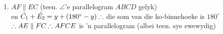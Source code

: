 \begin{eocsolutions}{}
{\begin{enumerate}[itemsep=5pt, label=\textbf{\arabic*}. ]
\begin{enumerate}[noitemsep, label=\textbf{(\alph*)} ]
In $\triangle ADE$\\
$\hat{D} + \hat{A_1} + \hat{E_1} = 180^{\circ}$ (som van $\angle$'e in $\triangle$)\\
$\therefore \hat{D} + y + y = 180^{\circ}\\
\therefore \hat{D} = 180^{\circ} - 2y$\\
$\hat{D} = 90^{\circ} - y\\
\therefore \hat{B} = 90^{\circ} - y$ (teen. $\angle$'e parallelogram $ABCD$ gelyk)\\

\item 
$AF\parallel EC$ (teen. $\angle$'e parallelogram $ABCD$ gelyk)\\
en $\hat{C_1} + \hat{E_2} = y + (180^{\circ} - y)\\
\therefore $ die som van die ko-binnehoeke is $180^{\circ}$\\
$\therefore AE \parallel FC\\
\therefore AFCE$ is 'n parallelogram (albei teen. sye ewewydig)
\end{enumerate}


\end{enumerate}}
\end{eocsolutions}
